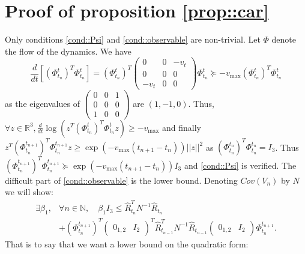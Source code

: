 \documentclass[a4paper,12pt,onecolumn]{article}
\newcommand{\NN}{{\mathbb N}}
\begin{document}
\section{Proof of proposition \ref{prop::car}}
\label{proof::car}
Only conditions \eqref{cond::Psi} and \eqref{cond::observable} are non-trivial. Let $\Phi$ denote the flow of the dynamics. We have $$ \frac{d}{dt} \left[ (\Phi^t_{t_n})^T \Phi^t_{t_n} \right] = (\Phi^t_{t_n})^T \begin{pmatrix} 0 & 0 & -v_t \\ 0 & 0 & 0 \\ -v_t & 0 & 0 \end{pmatrix} \Phi^t_{t_n} \succeq -v_{\max} (\Phi^t_{t_n})^T \Phi^t_{t_n}  $$ as the eigenvalues of $ \begin{pmatrix} 0 & 0 & 1 \\ 0 & 0 & 0 \\ 1 & 0 & 0 \end{pmatrix}$ are $(1,-1,0)$. Thus, $\forall z\in \mathbb{R}^3, \frac{d}{dt} \log \left( z^T \left( \Phi^t_{t_n} \right)^T \Phi^t_{t_n} z   \right) \geqslant -v_{\max}$ and finally $z^T(\Phi^{t_{n+1}}_{t_n})^T \Phi_{t_n}^{t_{n+1}} z \geqslant \exp \left(- v_{\max} (t_{n+1}-t_n) \right) ||z||^2$ as $(\Phi^{t_n}_{t_n})^T \Phi_{t_n}^{t_n}=I_3$.  Thus $(\Phi^{t_{n+1}}_{t_n})^T \Phi_{t_n}^{t_{n+1}} \succeq \exp \left(- v_{\max} (t_{n+1}-t_n) \right)I_3$ and \eqref{cond::Psi} is verified. The difficult part of \eqref{cond::observable} is the lower bound. Denoting $Cov(V_n)$ by $N$ we will show:
\begin{align*}
  \exists \beta_1, & \forall n \in \NN, \quad \beta_1 I_3 \leq \hat{R}_{t_n}^T N^{-1} \hat{R}_{t_n} \\
 & + (\Phi_{t_n}^{t_{n+1}})^T \begin{pmatrix} 0_{1,2} & I_2 \end{pmatrix}^T \hat{R}_{t_{n-1}}^T N^{-1} \hat{R}_{t_{n-1}} \begin{pmatrix} 0_{1,2} & I_2 \end{pmatrix}  \Phi_{t_n}^{t_{n+1}}.
\end{align*}
That is to say that we want a lower bound on the quadratic form: 
\end{document}

